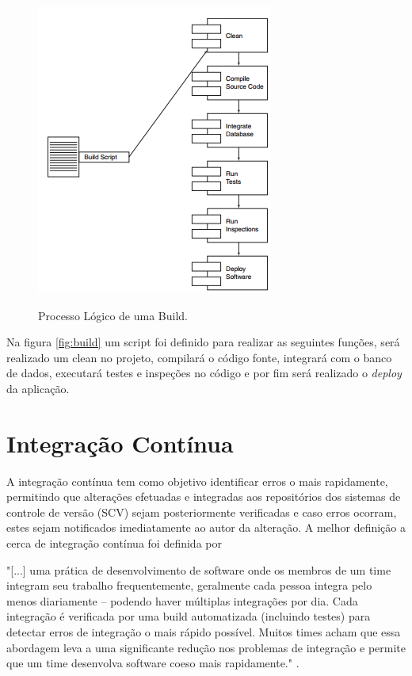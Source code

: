 \begin{figure}[H]
\centering
\caption[Processo Lógico de uma Build]{Processo Lógico de uma Build.}
\includegraphics[scale=0.9]{./images/build}
\label{fig:build}
\end{figure}
Na figura \autoref{fig:build} um script foi definido para realizar as seguintes funções, será realizado um clean no projeto, compilará o código fonte, integrará com o banco de dados, executará testes e inspeções no código e por fim será realizado o \textit{deploy} da aplicação.



\section{Integração Contínua}\label{integracaocont}
\begin{OnehalfSpace}
A integração contínua tem como objetivo identificar erros o mais rapidamente, permitindo que alterações efetuadas e integradas aos repositórios dos sistemas de controle de versão (SCV) sejam posteriormente verificadas e caso erros ocorram, estes sejam notificados imediatamente ao autor da alteração.
A melhor definição a cerca de integração contínua foi definida por 
\end{OnehalfSpace}

\begin{citacao}
"[...] uma prática de desenvolvimento de software onde os membros de um time integram seu trabalho frequentemente, geralmente cada pessoa integra pelo menos diariamente – podendo haver múltiplas integrações por dia. Cada integração é verificada por uma build automatizada (incluindo testes) para detectar erros de integração o mais rápido possível. Muitos times acham que essa abordagem leva a uma significante redução nos problemas de integração e permite que um time desenvolva software coeso mais rapidamente." .
\end{citacao}

